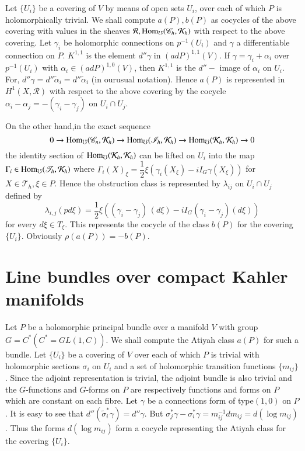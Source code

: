 Let $\{U_i\}$ be a covering of $V$ by means of open sets $U_i$, over
each of which $P$ is holomorphically trivial. We shall compute $a(P),
b(P)$ as cocycles of the above covering with values in the sheaves
$\mathcal{R}, \Hom_\mho (\mathscr{C}_h,\break \mathcal{K}_h)$ with respect to
the above covering. Let $\gamma_i$ be holomorphic connections on
$p^{-1}(U_i)$ and $\gamma$ a differentiable connection on
$P$. $K^{1,1}$ is the element $d'' \gamma $ in $(ad P)^{1,1} (V)$. If
$\gamma = \gamma_i + \alpha_i$ over $p^{-1}(U_i)$ with $\alpha_i \in
(ad P)^{1, 0}(V)$, then $K^{1,1}$ is the $d''-$ image of $\alpha_i$ on
$U_i$. For, $d'' \gamma = d'' \tilde{\alpha}_i = d'' \tilde{\alpha}_i$
(in our\pageoriginale usual notation). Hence $a(P)$ is represented in $H^1 (X,
\mathcal{R})$ with respect to the above covering by the cocycle
$\alpha_i - \alpha_j = - (\gamma_i - \gamma_j)$ on $U_i \cap U_j$. 

On the other hand,in the exact sequence
$$
0 \to \operatorname{Hom}_\mho (\mathscr{C}_n , \mathcal{K}_h) \to \operatorname{Hom}_\mho
(\mathscr{I}_h,\mathcal{K}_h) \to \operatorname{Hom}_\mho (\mathcal{K}_h,
\mathcal{K}_h) \to 0  
$$
the identity section of $\operatorname{Hom}_\mho (\mathcal{K}_h, \mathcal{K}_h)$ can
be lifted on $U_i$ into the map $\Gamma_i \in \operatorname{Hom}_\mho (\mathscr{T}_h,
\mathcal{K}_h)$ where $\Gamma_i (X)_\xi = \dfrac{1}{2} \xi (\gamma_i
(X_\xi) - iI_G \gamma (X_\xi))$ for $X \in \mathscr{T}_h, \xi \in
P$. Hence the obstruction class is represented by $\lambda_{ij}$ on
$U_i \cap U_j$ defined by 
$$
\lambda_{i, j} (pd \xi) = \frac{1}{2} \xi ((\gamma_i - \gamma_j) \,(d
\xi)-iI_G (\gamma_i - \gamma_j )(d \xi)) 
$$
for every $d \xi \in T_\xi$. This represents the cocycle of the class
$b(P)$ for the covering $\{U_i\}$. Obviously $\rho (a(P)) = - b(P)$. 

\section{Line bundles over compact Kahler manifolds}\label{chap6:sec8}%

Let $P$ be a holomorphic principal bundle over a manifold $V$ with
group $G = C^* (C^* = GL (1, C))$. We shall compute the Atiyah class
$a(P)$ for such a bundle. Let $\{U_i\}$ be a covering of $V$ over each
of which $P$ is trivial with holomorphic sections $\sigma_i$ on $U_i$
and a set of holomorphic transition functions $\{m_{ij}\}$. Since the
adjoint representation is trivial, the adjoint bundle is also trivial
and the $G$-functions and $G$-forms on $P$ are respectively functions and
forms on $P$ which are constant on each fibre. Let $\gamma$ be a
connections form of type\pageoriginale $(1, 0)$ on $P$. It is easy to see that $d''
(\tilde{\sigma}_i ^* \gamma) = d'' \gamma$. But $\sigma^*_j \gamma -
\sigma^*_i \gamma = m_{ij} ^{-1} dm_{ij} = d (\log m_{ij})$. Thus the
forms $d (\log m_{ij})$ form a cocycle representing the Atiyah class
for the covering $\{U_i\}$. 


